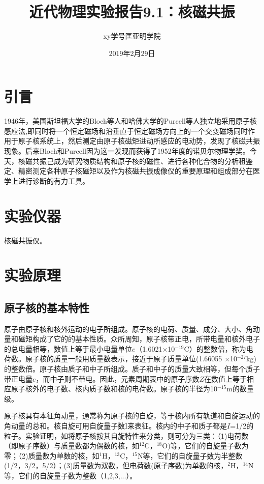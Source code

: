 \documentclass[a4paper]{article}
\title{近代物理实验报告9.1：核磁共振}
\author{xy\quad 学号\quad 匡亚明学院}
\date{2019年2月29日}
\begin{document}
\maketitle


\section{引言}
1946年，美国斯坦福大学的Bloch等人和哈佛大学的Purcell等人独立地采用原子核感应法,即同时将一个恒定磁场和沿垂直于恒定磁场方向上的一个交变磁场同时作用于原子核系统上，然后测定由原子核磁矩进动所感应的电动势，发现了核磁共振现象。后来Bloch和Purcell因为这一发现而获得了1952年度的诺贝尔物理学奖。今天，核磁共振己成为研究物质结构和原子核的磁性、进行各种化合物的分析租鉴定、精密测定各种原子核磁矩以及作为核磁共振成像仪的重要原理和组成部分在医学上进行诊断的有力工具。

\section{实验仪器}
核磁共振仪。

\section{实验原理}
\subsection{原子核的基本特性}

原子由原子核和核外运动的电子所组成。原子核的电荷、质量、成分、大小、角动量和磁矩构成了它的的基本性质。众所周知，原子核带正电，所带电量和核外电子的总电量相等，数值上等于最小电量单位$e$（1.6021$\times $10$^{-19}$C）的整数倍，称为电荷数。原子核的质量一般用质量数表示，接近于原子质量单位(1.66055 $\times $10$^{-27}$kg)的整数倍。原子核由质子和中子所组成。质子和中子的质量大致相等，但每个质子带正电量$e$，而中子则不带电。因此，元素周期表中的原子序数$Z$在数值上等于相应原子核外的电子数、核内质子数和核的电荷数。原子核的半径为10$^{-15}$m的数量级。

原子核具有本征角动量，通常称为原子核的自旋，等于核内所有轨道和自旋运动的角动量的总和。核自旋可用自旋量子数I来表征。核内的中子和质子都是$I$=1/2的粒子。实验证明，如将原子核按其自旋特性来分类，则可分为三类：（1)电荷数（即原子序数）与质量数都为偶数的核，如$^{12}$C，$^{18}$O)等，它们的自旋量子数为零；（2)质量数为单数的核，如$^1$H，$^{13}$C，$^{15}$N等，它们的自旋量子数为半整数(1/2，3/2，5/2）；(3)质量数为双数，但电荷数(原子序数)为单数的核，$^2$H，$^{14}$N等，它们的自旋量子数为整数（1,2,3,...）。
\end{document}
